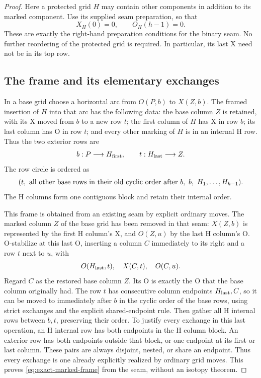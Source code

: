 \documentclass[11pt,a4paper]{article}
\theoremstyle{remark}
\begin{document}
\begin{proof}

Here a protected grid $H$ may contain other components in addition to its
marked component.  Use its supplied seam preparation, so that
\[
 X_H(0)=0,\qquad O_H(h-1)=0.
\]
These are exactly the right-hand preparation conditions for the binary
seam.  No further reordering of the protected grid is required.  In
particular, its last X need not be in its top row.

\subsection{The frame and its elementary exchanges}

In a base grid choose a horizontal arc from $O(P,b)$ to $X(Z,b)$.
The framed insertion of $H$ into that arc has the following data:
the base column $Z$ is retained, with its X moved from $b$ to a new row
$t$; the first column of $H$ has X in row $b$; its last column has O
in row $t$; and every other marking of $H$ is in an internal H row.
Thus the two exterior rows are
\[
 b:P\longrightarrow H_{\rm first},\qquad
 t:H_{\rm last}\longrightarrow Z.
\]
The row circle is ordered as
\begin{equation}\label{eq:exact-marked-frame}
 (t,\ \hbox{all other base rows in their old cyclic order after }b,
       \ b,\ H_1,\ldots,H_{h-1}).
\end{equation}
The H columns form one contiguous block and retain their internal order.

This frame is obtained from an existing seam by explicit ordinary moves.
The marked column $Z$ of the base grid has been removed in that seam:
$X(Z,b)$ is represented by the first H column's X, and $O(Z,u)$ by the
last H column's O.  O-stabilize at this last O, inserting a column $C$
immediately to its right and a row $t$ next to $u$, with
\[
 O(H_{\rm last},t),\quad X(C,t),\quad O(C,u).
\]
Regard $C$ as the restored base column $Z$.  Its O is exactly the O that
the base column originally had.  The row $t$ has consecutive column
endpoints $H_{\rm last},C$, so it can be moved to immediately after $b$
in the cyclic order of the base rows, using strict exchanges and the
explicit shared-endpoint rule.  Then gather all H internal rows between
$b,t$, preserving their order.  To justify every exchange in this last
operation, an H internal row has both endpoints in the H column block.
An exterior row has both endpoints outside that block, or one endpoint
at its first or last column.  These pairs are always disjoint, nested,
or share an endpoint.  Thus every exchange is one already explicitly
realized by ordinary grid moves.  This proves
\eqref{eq:exact-marked-frame} from the seam, without an isotopy theorem.


\end{proof}
\end{document}
